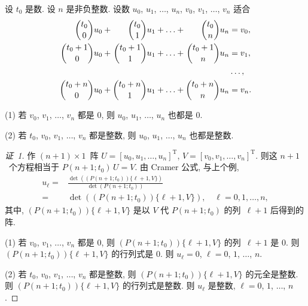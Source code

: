 \documentclass[../libro.tex]{subfiles}
\begin{document}
\begin{theorem}
    设 \(t_0\) 是数.
    设 \(n\) 是非负整数.
    设数 \(u_0\), \(u_1\), \(\dots\), \(u_n\),
    \(v_0\), \(v_1\), \(\dots\), \(v_n\)
    适合
    \begin{equation}
        \begin{alignedat}{7}
            \dbinom{t_0}{0} u_0   & {} + {} & \dbinom{t_0}{1} u_1   & {} + {} & \dots & {} + {} & \dbinom{t_0}{n} u_n   & {} = v_0, \\
            \dbinom{t_0+1}{0} u_0 & {} + {} & \dbinom{t_0+1}{1} u_1 & {} + {} & \dots & {} + {} & \dbinom{t_0+1}{n} u_n & {} = v_1, \\
            {}                    &         &                       &         &       &         &                       & \dots,    \\
            \dbinom{t_0+n}{0} u_0 & {} + {} & \dbinom{t_0+n}{1} u_1 & {} + {} & \dots & {} + {} & \dbinom{t_0+n}{n} u_n & {} = v_n.
        \end{alignedat}
        \label{eq:ff-system-of-linear-equations-with-binomial-coefficients}
    \end{equation}

    (1)
    若 \(v_0\), \(v_1\), \(\dots\), \(v_n\)
    都是 \(0\),
    则 \(u_0\), \(u_1\), \(\dots\), \(u_n\)
    也都是 \(0\).

    (2)
    若 \(t_0\), \(v_0\), \(v_1\), \(\dots\), \(v_n\)
    都是整数,
    则 \(u_0\), \(u_1\), \(\dots\), \(u_n\)
    也都是整数.
\end{theorem}

\begin{proof}[证~1]
    作 \((n + 1) \times 1\)~阵
    \(U = [u_0, u_1, \dots, u_n]^{\mathrm{T}}\),
    \(V = [v_0, v_1, \dots, v_n]^{\mathrm{T}}\).
    则这 \(n + 1\)~个方程相当于 \(P(n+1; t_0)\, U = V\).
    由 Cramer 公式, 与上个例,
    \begin{align*}
        u_\ell
        = {} & \frac{\det {((P(n+1; t_0)) \{\ell+1, V\})}}{\det {(P(n+1; t_0))}}
        \\
        = {} & \det {((P(n+1; t_0)) \{\ell+1, V\})},
        \quad
        \ell = 0, 1, \dots, n,
    \end{align*}
    其中, \((P(n+1; t_0)) \{\ell+1, V\}\)
    是以 \(V\) 代 \(P(n+1; t_0)\) 的列~\(\ell+1\) 后得到的阵.

    (1)
    若 \(v_0\), \(v_1\), \(\dots\), \(v_n\) 都是 \(0\),
    则 \((P(n+1; t_0)) \{\ell+1, V\}\) 的列~\(\ell+1\) 是 \(0\).
    则 \((P(n+1; t_0)) \{\ell+1, V\}\) 的行列式是 \(0\).
    则 \(u_\ell = 0\),
    \(\ell = 0\), \(1\), \(\dots\), \(n\).

    (2)
    若 \(t_0\), \(v_0\), \(v_1\), \(\dots\), \(v_n\) 都是整数,
    则 \((P(n+1; t_0)) \{\ell+1, V\}\) 的元全是整数.
    则 \((P(n+1; t_0)) \{\ell+1, V\}\) 的行列式是整数.
    则 \(u_\ell\) 是整数,
    \(\ell = 0\), \(1\), \(\dots\), \(n\).
\end{proof}
\end{document}
